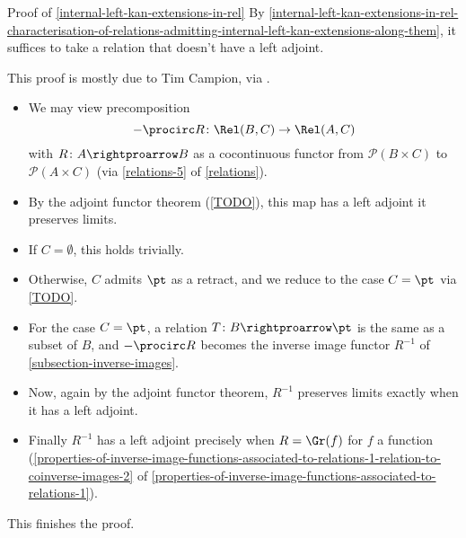 \begin{Proof}{Proof of \cref{internal-left-kan-extensions-in-rel}}%
    By \cref{internal-left-kan-extensions-in-rel-characterisation-of-relations-admitting-internal-left-kan-extensions-along-them}, it suffices to take a relation that doesn't have a left adjoint.

    This proof is mostly due to Tim Campion, via \cite{MO460693}.
    \begin{itemize}
        \item We may view precomposition
            \[
                -\procirc R%
                \colon%
                \Rel(B,C)%
                \to%
                \Rel(A,C)%
            \]%
            with $R\colon A\rightproarrow B$ as a cocontinuous functor from $\mathcal{P}(B\times C)$ to $\mathcal{P}(A\times C)$ (via \cref{relations-5} of \cref{relations}).
        \item By the adjoint functor theorem (\cref{TODO}), this map has a left adjoint \textiff it preserves limits.
        \item If $C=\emptyset$, this holds trivially.
        \item Otherwise, $C$ admits $\pt$ as a retract, and we reduce to the case $C=\pt$ via \cref{TODO}.
        \item For the case $C=\pt$, a relation $T\colon B\rightproarrow\pt$ is the same as a subset of $B$, and $-\procirc R$ becomes the inverse image functor $R^{-1}$ of \cref{subsection-inverse-images}.
        \item Now, again by the adjoint functor theorem, $R^{-1}$ preserves limits exactly when it has a left adjoint.
        \item Finally $R^{-1}$ has a left adjoint precisely when $R=\Gr(f)$ for $f$ a function (\cref{properties-of-inverse-image-functions-associated-to-relations-1-relation-to-coinverse-images-2} of \cref{properties-of-inverse-image-functions-associated-to-relations-1}).
    \end{itemize}
    This finishes the proof.
\end{Proof}
